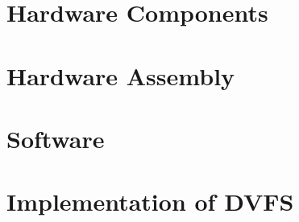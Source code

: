 \section{Hardware Components}

\section{Hardware Assembly}

\section{Software}

\section{Implementation of DVFS}

